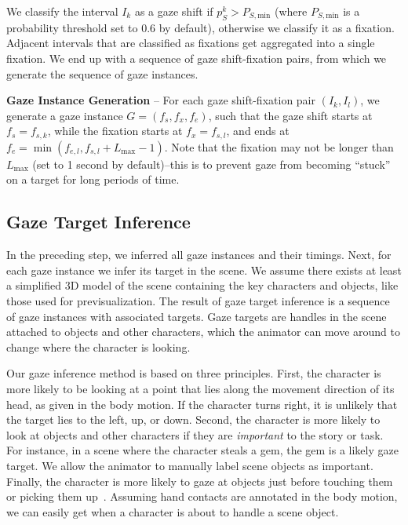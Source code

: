 We classify the interval $I_k$ as a gaze shift if $p_S^k > P_{S,\mathrm{min}}$ (where $P_{S,\mathrm{min}}$ is a probability threshold set to 0.6 by default), otherwise we classify it as a fixation. Adjacent intervals that are classified as fixations get aggregated into a single fixation. We end up with a sequence of gaze shift-fixation pairs, from which we generate the sequence of gaze instances.

\noindent\textbf{Gaze Instance Generation} -- For each gaze shift-fixation pair $(I_k, I_l)$, we generate a gaze instance $G = (f_s, f_x, f_e)$, such that the gaze shift starts at $f_s = f_{s,k}$, while the fixation starts at $f_x = f_{s,l}$, and ends at $f_e = \mathop{min}(f_{e,l}, f_{s,l} + L_\mathrm{max} - 1)$. Note that the fixation may not be longer than $L_\mathrm{max}$ (set to 1 second by default)--this is to prevent gaze from becoming ``stuck'' on a target for long periods of time.

\subsection{Gaze Target Inference}
\label{sec:GazeTargetInference}

In the preceding step, we inferred all gaze instances and their timings. Next, for each gaze instance we infer its target in the scene. We assume there exists at least a simplified 3D model of the scene containing the key characters and objects, like those used for previsualization. The result of gaze target inference is a sequence of gaze instances with associated targets. Gaze targets are handles in the scene attached to objects and other characters, which the animator can move around to change where the character is looking.

Our gaze inference method is based on three principles. First, the character is more likely to be looking at a point that lies along the movement direction of its head, as given in the body motion. If the character turns right, it is unlikely that the target lies to the left, up, or down. Second, the character is more likely to look at objects and other characters if they are \emph{important} to the story or task. For instance, in a scene where the character steals a gem, the gem is a likely gaze target. We allow the animator to manually label scene objects as important. Finally, the character is more likely to gaze at objects just before touching them or picking them up~\cite{johansson2001eyehead}. Assuming hand contacts are annotated in the body motion, we can easily get when a character is about to handle a scene object.

